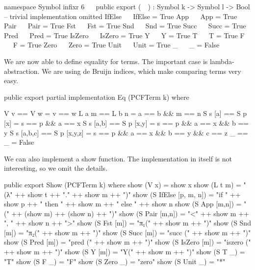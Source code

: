 \begin{code}
namespace Symbol
  infixr 6 ~~
  public export
  (~~) : Symbol k -> Symbol l -> Bool
  -- trivial implementation omitted
  IfElse ~~ IfElse = True
  App    ~~ App    = True
  Pair   ~~ Pair   = True
  Fst    ~~ Fst    = True
  Snd    ~~ Snd    = True
  Succ   ~~ Succ   = True
  Pred   ~~ Pred   = True
  IsZero ~~ IsZero = True
  Y      ~~ Y      = True
  T      ~~ T      = True
  F      ~~ F      = True
  Zero   ~~ Zero   = True
  Unit   ~~ Unit   = True
  _      ~~ _      = False
\end{code}

We are now able to define equality for terms. The important case is
lambda-abstraction. We are using de Bruijn indices, which make comparing terms
very easy.

\begin{code}
public export partial
implementation Eq (PCFTerm k) where

  V v         == V w          = v == w
  L a m       == L b n        = a == b && m == n
  S s [a]     == S p [x]      = s == p && a == x
  S s [a,b]   == S p [x,y]    = s == p && a == x && b == y
  S s [a,b,c] == S p [x,y,z]  = s == p && a == x && b == y && c == z
  _           == _            = False
\end{code}

We can also implement a show function. The implementation in itself is not
interesting, so we omit the details.

\begin{hidden}
public export
Show (PCFTerm k) where
  show (V x)                = show x
  show (L t m)              = "(λ" ++ show t ++ "." ++ show m ++ ")"
  show (S IfElse [p, m, n]) = "if " ++ show p ++ " then " ++ show m ++ " else " ++ show n
  show (S App    [m,n])     = "(" ++ (show m) ++ (show n) ++ ")"
  show (S Pair   [m,n])     = "<" ++ show m ++ ", " ++ show n ++ ">"
  show (S Fst    [m])       = "π₁(" ++ show m ++ ")"
  show (S Snd    [m])       = "π₂(" ++ show m ++ ")"
  show (S Succ   [m])       = "succ (" ++ show m ++ ")"
  show (S Pred   [m])       = "pred (" ++ show m ++ ")"
  show (S IsZero [m])       = "iszero (" ++ show m ++ ")"
  show (S Y      [m])       = "Y(" ++ show m ++ ")"
  show (S T      _)         = "T"
  show (S F      _)         = "F"
  show (S Zero   _)         = "zero"
  show (S Unit   _)         = "*"
\end{hidden}
